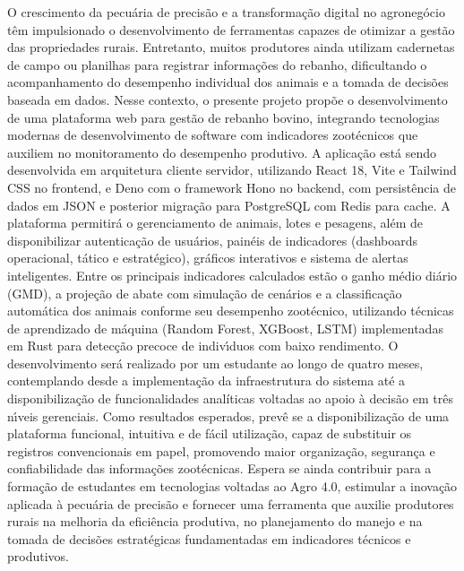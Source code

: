 \documentclass[12pt,a4paper]{article}
\begin{document}
O crescimento da pecu\'aria de precis\~ao e a transforma\c c\~ao digital no agroneg\'ocio t\^em impulsionado o desenvolvimento de ferramentas capazes de otimizar a gest\~ao das propriedades rurais. Entretanto, muitos produtores ainda utilizam cadernetas de campo ou planilhas para registrar informa\c c\~oes do rebanho, dificultando o acompanhamento do desempenho individual dos animais e a tomada de decis\~oes baseada em dados. Nesse contexto, o presente projeto prop\~oe o desenvolvimento de uma plataforma web para gest\~ao de rebanho bovino, integrando tecnologias modernas de desenvolvimento de software com indicadores zoot\'ecnicos que auxiliem no monitoramento do desempenho produtivo. A aplica\c c\~ao est\'a sendo desenvolvida em arquitetura cliente servidor, utilizando React 18, Vite e Tailwind CSS no frontend, e Deno com o framework Hono no backend, com persist\^encia de dados em JSON e posterior migra\c c\~ao para PostgreSQL com Redis para cache. A plataforma permitir\'a o gerenciamento de animais, lotes e pesagens, al\'em de disponibilizar autentica\c c\~ao de usu\'arios, pain\'eis de indicadores (dashboards operacional, t\'atico e estrat\'egico), gr\'aficos interativos e sistema de alertas inteligentes. Entre os principais indicadores calculados est\~ao o ganho m\'edio di\'ario (GMD), a proje\c c\~ao de abate com simula\c c\~ao de cen\'arios e a classifica\c c\~ao autom\'atica dos animais conforme seu desempenho zoot\'ecnico, utilizando t\'ecnicas de aprendizado de m\'aquina (Random Forest, XGBoost, LSTM) implementadas em Rust para detec\c c\~ao precoce de indiv\'{\i}duos com baixo rendimento. O desenvolvimento ser\'a realizado por um estudante ao longo de quatro meses, contemplando desde a implementa\c c\~ao da infraestrutura do sistema at\'e a disponibiliza\c c\~ao de funcionalidades anal\'iticas voltadas ao apoio \`a decis\~ao em tr\^es n\'{\i}veis gerenciais. Como resultados esperados, prev\^e se a disponibiliza\c c\~ao de uma plataforma funcional, intuitiva e de f\'acil utiliza\c c\~ao, capaz de substituir os registros convencionais em papel, promovendo maior organiza\c c\~ao, seguran\c ca e confiabilidade das informa\c c\~oes zoot\'ecnicas. Espera se ainda contribuir para a forma\c c\~ao de estudantes em tecnologias voltadas ao Agro 4.0, estimular a inova\c c\~ao aplicada \`a pecu\'aria de precis\~ao e fornecer uma ferramenta que auxilie produtores rurais na melhoria da efici\^encia produtiva, no planejamento do manejo e na tomada de decis\~oes estrat\'egicas fundamentadas em indicadores t\'ecnicos e produtivos.
\end{document}
